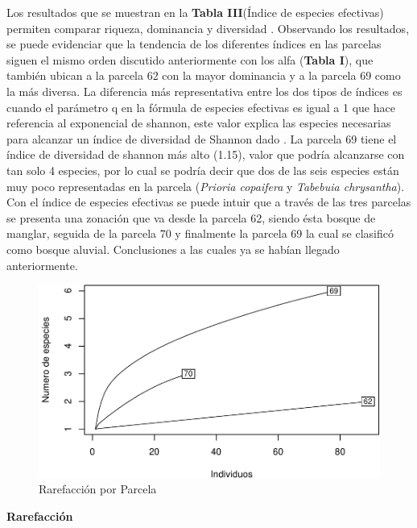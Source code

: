 \documentclass[conference,final,12pt,]{IEEEtran}
\makeatletter
\def\maxwidth{\ifdim\Gin@nat@width>\linewidth\linewidth
\else\Gin@nat@width\fi}
\let\Oldincludegraphics\includegraphics
\renewcommand{\includegraphics}[1]{\Oldincludegraphics[width=\maxwidth]{#1}}
\makeatother
\begin{document}
Los resultados que se muestran en la \textbf{Tabla III}(Índice de
especies efectivas) permiten comparar riqueza, dominancia y diversidad
\citep{V}. Observando los resultados, se puede evidenciar que la
tendencia de los diferentes índices en las parcelas siguen el mismo
orden discutido anteriormente con los alfa (\textbf{Tabla I}), que
también ubican a la parcela 62 con la mayor dominancia y a la parcela 69
como la más diversa. La diferencia más representativa entre los dos
tipos de índices es cuando el parámetro q en la fórmula de especies
efectivas es igual a 1 que hace referencia al exponencial de shannon,
este valor explica las especies necesarias para alcanzar un índice de
diversidad de Shannon dado \citep{B}. La parcela 69 tiene el índice
de diversidad de shannon más alto (1.15), valor que podría alcanzarse con
tan solo 4 especies, por lo cual se podría decir que dos de las seis
especies están muy poco representadas en la parcela (\emph{Prioria
copaifera} y \emph{Tabebuia chrysantha}). Con el índice de especies
efectivas se puede intuir que a través de las tres parcelas se presenta
una zonación que va desde la parcela 62, siendo ésta bosque de manglar,
seguida de la parcela 70 y finalmente la parcela 69 la cual se clasificó
como bosque aluvial. Conclusiones a las cuales ya se habían llegado
anteriormente.

\begin{figure}[htb]
\centering
\includegraphics{mangrove_files/figure-latex/unnamed-chunk-5-1.pdf}
\caption{Rarefacción por Parcela}
\end{figure}

\textbf{Rarefacción} 
\end{document}
